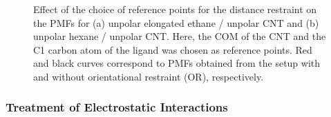 \documentclass[9pt,lessons,pubversion]{livecoms}
\begin{document}
\begin{figure}[htb!]
  \centering    
  \caption{
  Effect of the choice of reference points for the distance restraint on the PMFs for (a) unpolar elongated ethane / unpolar CNT and (b) unpolar hexane / unpolar CNT.
  Here, the COM of the CNT and the C1 carbon atom of the ligand was chosen as reference points.
  Red and black curves correspond to PMFs obtained from the setup with and without orientational restraint (OR), respectively.
  }
  \label{fig:refpoints}
\end{figure}

\subsubsection*{Treatment of Electrostatic Interactions}
\end{document}
